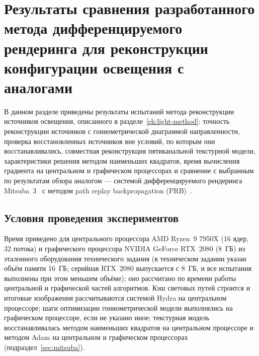 \chapter{Результаты сравнения разработанного метода дифференцируемого рендеринга для реконструкции конфигурации освещения с аналогами}
\label{chap:light-comparison}

В данном разделе приведены результаты испытаний метода реконструкции источников освещения, описанного в разделе~\ref{ch:light-method}: точность реконструкции источников с гониометрической диаграммой направленности, проверка восстановленных источников вне условий, по которым они восстанавливались, совместная реконструкция пятиканальной текстурной модели, характеристики решения методом наименьших квадратов, время вычисления градиента на центральном и графическом процессорах и сравнение с выбранным по результатам обзора аналогом --- системой дифференцируемого рендеринга Mitsuba~3~\cite{Mitsuba3} с методом path replay backpropagation (PRB)~\cite{PRB2021}.

\section{Условия проведения экспериментов}

Время приведено для центрального процессора AMD Ryzen~9 7950X (16 ядер, 32 потока) и графического процессора NVIDIA GeForce RTX~2080 (8~ГБ) из эталонного оборудования технического задания (в техническом задании указан объём памяти 16~ГБ; серийная RTX~2080 выпускается с 8~ГБ, и все испытания выполнены при этом меньшем объёме); оно рассчитано по времени работы центральной и графической частей алгоритмов. Кэш световых путей строится и итоговые изображения рассчитываются системой Hydra на центральном процессоре; шаги оптимизации гониометрической модели выполнялись на графическом процессоре, если не указано иное; текстурная модель восстанавливалась методом наименьших квадратов на центральном процессоре и методом Adam на центральном и графическом процессорах (подраздел~\ref{sec:mitsuba}).

